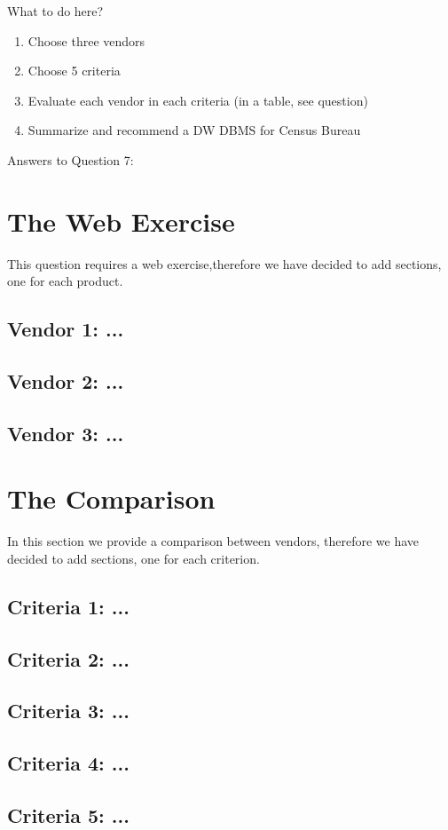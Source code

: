 What to do here?
\begin{enumerate}
    \item Choose three vendors
    \item Choose 5 criteria
    \item Evaluate each vendor in each criteria (in a table, see question)
    \item Summarize and recommend a DW DBMS for Census Bureau
  \end{enumerate}
\newpage Answers to Question 7:
\section{The Web Exercise}
This question requires a web exercise,therefore we have decided to add sections, one for each product. 

\subsection{Vendor 1: ...}
    
\subsection{Vendor 2: ...}
    
\subsection{Vendor 3: ...}

\section{The Comparison}
In this section we provide a comparison between vendors, therefore we have decided to add sections, one for each criterion. 

\subsection{Criteria 1: ...}
    
\subsection{Criteria 2: ...}
    
\subsection{Criteria 3: ...}

\subsection{Criteria 4: ...}

\subsection{Criteria 5: ...}

